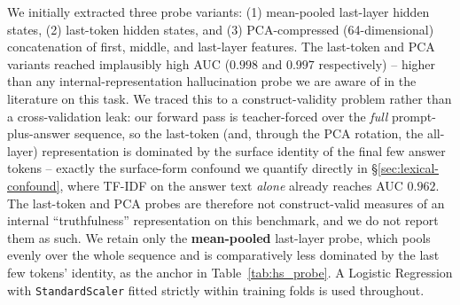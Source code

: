 \documentclass{article}
\begin{document}
We initially extracted three probe variants: (1) mean-pooled last-layer hidden states, (2) last-token
hidden states, and (3) PCA-compressed (64-dimensional) concatenation of first, middle, and last-layer
features. The last-token and PCA variants reached implausibly high AUC ($0.998$ and $0.997$
respectively) -- higher than any internal-representation hallucination probe we are aware of in the
literature on this task. We traced this to a construct-validity problem rather than a cross-validation
leak: our forward pass is teacher-forced over the \emph{full} prompt-plus-answer sequence, so the
last-token (and, through the PCA rotation, the all-layer) representation is dominated by the surface
identity of the final few answer tokens -- exactly the surface-form confound we quantify directly in
\S\ref{sec:lexical-confound}, where TF-IDF on the answer text \emph{alone} already reaches AUC $0.962$.
The last-token and PCA probes are therefore not construct-valid measures of an internal
``truthfulness'' representation on this benchmark, and we do not report them as such. We retain only
the \textbf{mean-pooled} last-layer probe, which pools evenly over the whole sequence and is
comparatively less dominated by the last few tokens' identity, as the anchor in Table~\ref{tab:hs_probe}.
A Logistic Regression with \texttt{StandardScaler} fitted strictly within training folds is used throughout.

\begin{table}[ht]
\centering
\small
{}
\caption{\textbf{Hidden-State Probe vs.\ TDA Baselines on HaluEval QA (Qwen2.5-3B).} Grouped 10-fold cross-validation under identical protocol. We report only the mean-pooled probe (see text for why the last-token and PCA variants are excluded); both TDA numbers use the canonical scaled pipeline of \S\ref{sec:audit}. $^\dagger$The log-probability rows use a different, smaller subset ($N{=}329$ scoreable rows from the same $200$ HaluEval questions as Appendix~\ref{app:perhead}'s per-head ablation, not the full $N{=}4000$) and are not directly numerically comparable to the other two rows' full-benchmark numbers -- included here because it is the single strongest baseline in the paper and the discussion (\S\ref{sec:discussion}) explains why we read it with caution rather than as a clean win.}
\label{tab:hs_probe}
\end{table}
\end{document}
